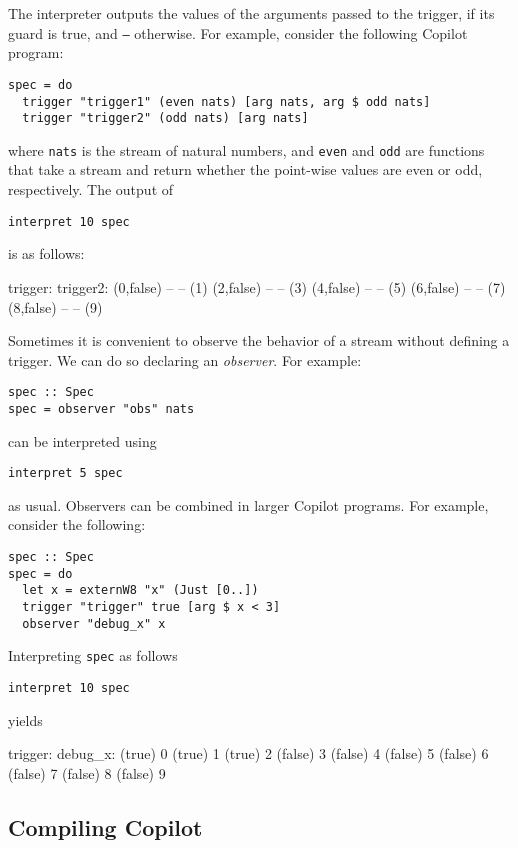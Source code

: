 The interpreter outputs the values of the arguments passed to the trigger, if
its guard is true, and {\tt --} otherwise. For example, consider the following
Copilot program:
%
\begin{lstlisting}[language = Copilot]
spec = do
  trigger "trigger1" (even nats) [arg nats, arg $ odd nats]
  trigger "trigger2" (odd nats) [arg nats]
\end{lstlisting}
where {\tt nats} is the stream of natural numbers, and {\tt even} and {\tt odd}
are functions that take a stream and return whether the point-wise values are
even or odd, respectively. The output of
%
\begin{lstlisting}[language = Copilot]
interpret 10 spec
\end{lstlisting}
%
is as follows:
%
\begin{code}
trigger:   trigger2:
(0,false)  --
--         (1)
(2,false)  --
--         (3)
(4,false)  --
--         (5)
(6,false)  --
--         (7)
(8,false)  --
--         (9)
\end{code}
%

Sometimes it is convenient to observe the behavior of a stream without defining
a trigger. We can do so declaring an \emph{observer}. For example:
%
\begin{lstlisting}[language = Copilot]
spec :: Spec
spec = observer "obs" nats
\end{lstlisting}
%
can be interpreted using
%
\begin{lstlisting}[language = Copilot]
interpret 5 spec
\end{lstlisting}
%
as usual. Observers can be combined in larger Copilot programs. For example,
consider the following:
%
\begin{lstlisting}[language = Copilot]
spec :: Spec
spec = do
  let x = externW8 "x" (Just [0..])
  trigger "trigger" true [arg $ x < 3]
  observer "debug_x" x
\end{lstlisting}
Interpreting {\tt spec} as follows
%
\begin{lstlisting}[language = Copilot]
interpret 10 spec
\end{lstlisting}
%
yields
%
\begin{code}
trigger:  debug_x:
(true)    0
(true)    1
(true)    2
(false)   3
(false)   4
(false)   5
(false)   6
(false)   7
(false)   8
(false)   9
\end{code}

\subsection{Compiling Copilot} \label{sec:compiling}

